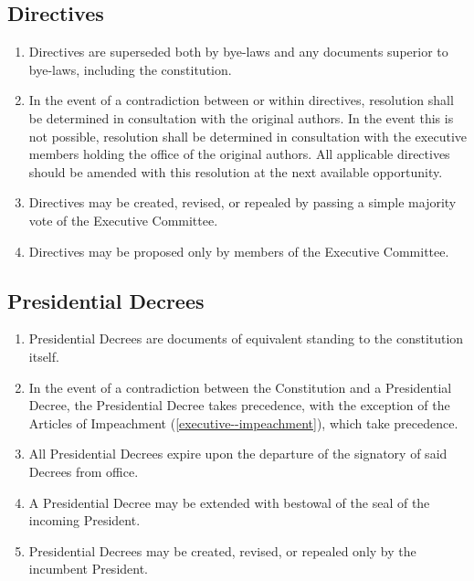 \documentclass{scrartcl}
\begin{document}
        \subsection{Directives}
            \label{documentation--directive}
            \begin{enumerate}
                \item Directives are superseded both by bye-laws and any documents superior to bye-laws, including the constitution.
                \item In the event of a contradiction between or within directives, resolution shall be determined in consultation with the original authors. In the event this is not possible, resolution shall be determined in consultation with the executive members holding the office of the original authors. All applicable directives should be amended with this resolution at the next available opportunity.
                \item Directives may be created, revised, or repealed by passing a simple majority vote of the Executive Committee.
                \item Directives may be proposed only by members of the Executive Committee.
            \end{enumerate}

        \subsection{Presidential Decrees}
            \label{documentation--presidential-decree}
            \begin{enumerate}
                \item Presidential Decrees are documents of equivalent standing to the constitution itself.
                \item In the event of a contradiction between the Constitution and a Presidential Decree, the Presidential Decree takes precedence, with the exception of the Articles of Impeachment (\ref{executive--impeachment}), which take precedence.
                \item All Presidential Decrees expire upon the departure of the signatory of said Decrees from office.
                \item A Presidential Decree may be extended with bestowal of the seal of the incoming President.
                \item Presidential Decrees may be created, revised, or repealed only by the incumbent President.
            \end{enumerate}
\end{document}
